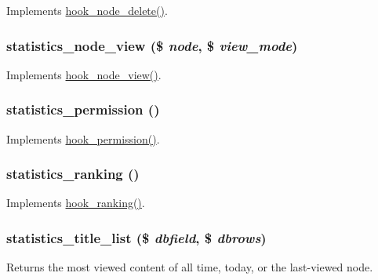 \label{statistics_8module_ad05403b236249d273b4c19755a4f6b0a}
Implements \hyperlink{group__node__api__hooks_ga66ea0473a9950dc961802e801e5042e9}{hook\_\-node\_\-delete()}. \hypertarget{statistics_8module_aea42e870ef6f9238a3ebd9e0557ce0d7}{
\subsubsection[{statistics\_\-node\_\-view}]{\setlength{\rightskip}{0pt plus 5cm}statistics\_\-node\_\-view (\$ {\em node}, \/  \$ {\em view\_\-mode})}}
\label{statistics_8module_aea42e870ef6f9238a3ebd9e0557ce0d7}
Implements \hyperlink{group__node__api__hooks_ga475290ee8e81a2373ea17c512cc3f9a9}{hook\_\-node\_\-view()}. \hypertarget{statistics_8module_ac907dfbe126a841baf3b9c42d450a20f}{
\subsubsection[{statistics\_\-permission}]{\setlength{\rightskip}{0pt plus 5cm}statistics\_\-permission ()}}
\label{statistics_8module_ac907dfbe126a841baf3b9c42d450a20f}
Implements \hyperlink{group__hooks_ga2b22b45f4925f2478412477bae329713}{hook\_\-permission()}. \hypertarget{statistics_8module_a725cf7357a2f66e80373d7c2975554fa}{
\subsubsection[{statistics\_\-ranking}]{\setlength{\rightskip}{0pt plus 5cm}statistics\_\-ranking ()}}
\label{statistics_8module_a725cf7357a2f66e80373d7c2975554fa}
Implements \hyperlink{group__node__api__hooks_gaf7a28ce3230dc96833ea5338fd26f43c}{hook\_\-ranking()}. \hypertarget{statistics_8module_a1c03906824bea12cc22348f58d6a1531}{
\subsubsection[{statistics\_\-title\_\-list}]{\setlength{\rightskip}{0pt plus 5cm}statistics\_\-title\_\-list (\$ {\em dbfield}, \/  \$ {\em dbrows})}}
\label{statistics_8module_a1c03906824bea12cc22348f58d6a1531}
Returns the most viewed content of all time, today, or the last-\/viewed node.


